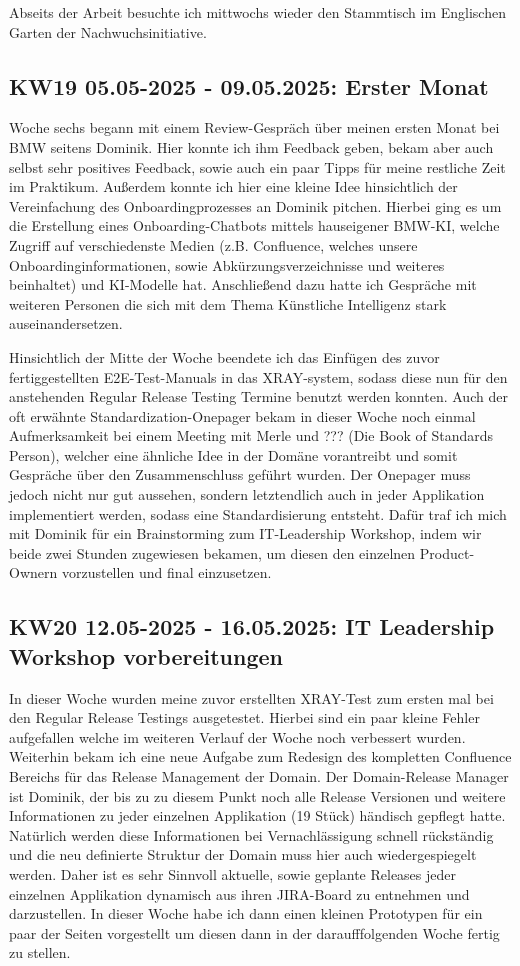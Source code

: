 Abseits der Arbeit besuchte ich mittwochs wieder den Stammtisch im Englischen Garten der Nachwuchsinitiative.


\subsection{KW19 05.05-2025 - 09.05.2025: Erster Monat}
Woche sechs begann mit einem Review-Gespräch über meinen ersten Monat bei BMW seitens Dominik. 
Hier konnte ich ihm Feedback geben, bekam aber auch selbst sehr positives Feedback, sowie auch ein paar Tipps für meine restliche Zeit im Praktikum.
Außerdem konnte ich hier eine kleine Idee hinsichtlich der Vereinfachung des Onboardingprozesses an Dominik pitchen. 
Hierbei ging es um die Erstellung eines Onboarding-Chatbots mittels hauseigener BMW-KI, welche Zugriff auf verschiedenste Medien (z.B. Confluence, welches unsere Onboardinginformationen, sowie Abkürzungsverzeichnisse und weiteres beinhaltet) und KI-Modelle hat.
Anschließend dazu hatte ich Gespräche mit weiteren Personen die sich mit dem Thema Künstliche Intelligenz stark auseinandersetzen.

Hinsichtlich der Mitte der Woche beendete ich das Einfügen des zuvor fertiggestellten \ac{E2E}-Test-Manuals in das XRAY-system, sodass diese nun für den anstehenden Regular Release Testing Termine benutzt werden konnten.
Auch der oft erwähnte Standardization-Onepager bekam in dieser Woche noch einmal Aufmerksamkeit bei einem Meeting mit Merle und ??? (Die Book of Standards Person), welcher eine ähnliche Idee in der Domäne vorantreibt und somit Gespräche über den Zusammenschluss geführt wurden.
Der Onepager muss jedoch nicht nur gut aussehen, sondern letztendlich auch in jeder Applikation implementiert werden, sodass eine Standardisierung entsteht.
Dafür traf ich mich mit Dominik für ein Brainstorming zum IT-Leadership Workshop, indem wir beide zwei Stunden zugewiesen bekamen, um diesen den einzelnen Product-Ownern vorzustellen und final einzusetzen.


\subsection{KW20 12.05-2025 - 16.05.2025: IT Leadership Workshop vorbereitungen}
In dieser Woche wurden meine zuvor erstellten XRAY-Test zum ersten mal bei den Regular Release Testings ausgetestet.
Hierbei sind ein paar kleine Fehler aufgefallen welche im weiteren Verlauf der Woche noch verbessert wurden.
Weiterhin bekam ich eine neue Aufgabe zum Redesign des kompletten Confluence Bereichs für das Release Management der Domain.
Der Domain-Release Manager ist Dominik, der bis zu zu diesem Punkt noch alle Release Versionen und weitere Informationen zu jeder einzelnen Applikation (19 Stück) händisch gepflegt hatte.
Natürlich werden diese Informationen bei Vernachlässigung schnell rückständig und die neu definierte Struktur der Domain muss hier auch wiedergespiegelt werden.
Daher ist es sehr Sinnvoll aktuelle, sowie geplante Releases jeder einzelnen Applikation dynamisch aus ihren JIRA-Board zu entnehmen und darzustellen. 
In dieser Woche habe ich dann einen kleinen Prototypen für ein paar der Seiten vorgestellt um diesen dann in der daraufffolgenden Woche fertig zu stellen.


